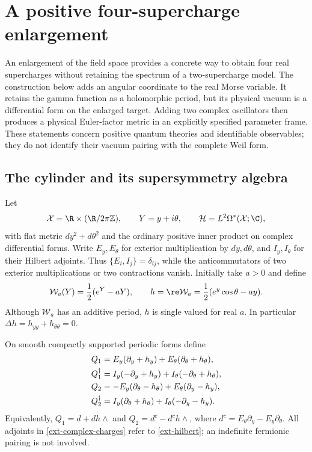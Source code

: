 \section{A positive four-supercharge enlargement}
\label{ext-section}

An enlargement of the field space provides a concrete way to obtain four
real supercharges without retaining the spectrum of a two-supercharge
model.  The construction below adds an angular coordinate to the real
Morse variable.  It retains the gamma function as a holomorphic period,
but its physical vacuum is a differential form on the enlarged target.
Adding two complex oscillators then produces a physical Euler-factor
metric in an explicitly specified parameter frame.  These statements
concern positive quantum theories and identifiable observables; they do
not identify their vacuum pairing with the complete Weil form.

\subsection{The cylinder and its supersymmetry algebra}
\label{ext-cylinder}

Let
\begin{equation}
 \mathcal X=\R\times(\R/2\pi\mathbb Z),\qquad
 Y=y+i\theta,\qquad
 \mathcal H=L^2\Omega^*(\mathcal X;\C),
 \label{ext-hilbert}
\end{equation}
with flat metric $dy^2+d\theta^2$ and the ordinary positive inner product
on complex differential forms.  Write $E_y,E_\theta$ for exterior
multiplication by $dy,d\theta$, and $I_y,I_\theta$ for their Hilbert
adjoints.  Thus $\{E_i,I_j\}=\delta_{ij}$, while the anticommutators of
two exterior multiplications or two contractions vanish.  Initially
take $a>0$ and define
\begin{equation}
 \mathcal W_a(Y)=\frac12(e^Y-aY),\qquad
 h=\re\mathcal W_a
   =\frac12(e^y\cos\theta-ay).
 \label{ext-superpotential}
\end{equation}
Although $\mathcal W_a$ has an additive period, $h$ is single valued for
real $a$.  In particular $\Delta h=h_{yy}+h_{\theta\theta}=0$.

On smooth compactly supported periodic forms define
\begin{align}
 Q_1&=E_y(\partial_y+h_y)+E_\theta(\partial_\theta+h_\theta),\notag\\
 Q_1^\dagger&=I_y(-\partial_y+h_y)
                    +I_\theta(-\partial_\theta+h_\theta),\notag\\
 Q_2&=-E_y(\partial_\theta-h_\theta)+E_\theta(\partial_y-h_y),\notag\\
 Q_2^\dagger&=I_y(\partial_\theta+h_\theta)
                    +I_\theta(-\partial_y-h_y).
 \label{ext-complex-charges}
\end{align}
Equivalently, $Q_1=d+dh\wedge$ and $Q_2=d^c-d^ch\wedge$, where
$d^c=E_\theta\partial_y-E_y\partial_\theta$.  All adjoints in
\eqref{ext-complex-charges} refer to \eqref{ext-hilbert}; an indefinite
fermionic pairing is not involved.


